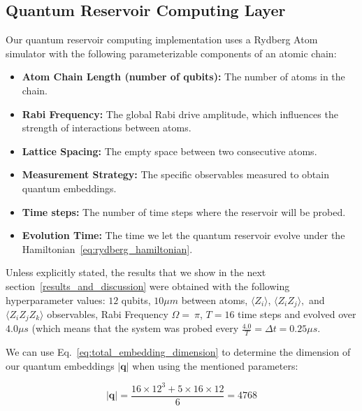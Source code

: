 \documentclass[conference]{IEEEtran}
\begin{document}
\subsection{Quantum Reservoir Computing Layer}
Our quantum reservoir computing implementation uses a Rydberg Atom simulator with the following parameterizable components of an atomic chain:

\begin{itemize}
    \item \textbf{Atom Chain Length (number of qubits):} 
    The number of atoms in the chain.
    
    \item \textbf{Rabi Frequency:} 
    The global Rabi drive amplitude, which influences the strength of interactions between atoms.
    
    \item \textbf{Lattice Spacing:} 
    The empty space between two consecutive atoms.
    
    \item \textbf{Measurement Strategy:} 
    The specific observables measured to obtain quantum embeddings.

    \item \textbf{Time steps:}
    The number of time steps where the reservoir will be probed.

    \item \textbf{Evolution Time:}
    The time we let the quantum reservoir evolve under the Hamiltonian~\ref{eq:rydberg_hamiltonian}.
\end{itemize}

Unless explicitly stated, the results that we show in the next section~\ref{results_and_discussion} were obtained with the following hyperparameter values: $12$ qubits, $10 \mu m$ between atoms, \(\langle Z_i\rangle\), \(\langle Z_iZ_j\rangle,\) and \(\langle Z_iZ_jZ_k\rangle\) observables, Rabi Frequency $\Omega = \ \pi$, $T = 16$ time steps and evolved over $4.0 \mu s$ (which means that the system was probed every $\frac{4.0}{T} = \Delta t = 0.25 \mu s$.

We can use Eq.~\ref{eq:total_embedding_dimension} to determine the dimension of our quantum embeddings \(\lvert \bm q \rvert \) when using the mentioned parameters:

\begin{equation}
    \lvert \bm q \rvert = \frac{16 \times 12^3 + 5 \times 16 \times 12}{6} = 4768
    \label{eq:experimental_embedding_dimension}
\end{equation}
\end{document}
